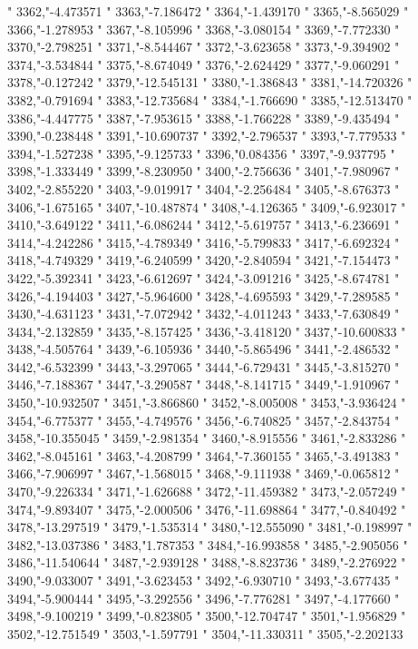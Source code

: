 "
3362,"-4.473571
"
3363,"-7.186472
"
3364,"-1.439170
"
3365,"-8.565029
"
3366,"-1.278953
"
3367,"-8.105996
"
3368,"-3.080154
"
3369,"-7.772330
"
3370,"-2.798251
"
3371,"-8.544467
"
3372,"-3.623658
"
3373,"-9.394902
"
3374,"-3.534844
"
3375,"-8.674049
"
3376,"-2.624429
"
3377,"-9.060291
"
3378,"-0.127242
"
3379,"-12.545131
"
3380,"-1.386843
"
3381,"-14.720326
"
3382,"-0.791694
"
3383,"-12.735684
"
3384,"-1.766690
"
3385,"-12.513470
"
3386,"-4.447775
"
3387,"-7.953615
"
3388,"-1.766228
"
3389,"-9.435494
"
3390,"-0.238448
"
3391,"-10.690737
"
3392,"-2.796537
"
3393,"-7.779533
"
3394,"-1.527238
"
3395,"-9.125733
"
3396,"0.084356
"
3397,"-9.937795
"
3398,"-1.333449
"
3399,"-8.230950
"
3400,"-2.756636
"
3401,"-7.980967
"
3402,"-2.855220
"
3403,"-9.019917
"
3404,"-2.256484
"
3405,"-8.676373
"
3406,"-1.675165
"
3407,"-10.487874
"
3408,"-4.126365
"
3409,"-6.923017
"
3410,"-3.649122
"
3411,"-6.086244
"
3412,"-5.619757
"
3413,"-6.236691
"
3414,"-4.242286
"
3415,"-4.789349
"
3416,"-5.799833
"
3417,"-6.692324
"
3418,"-4.749329
"
3419,"-6.240599
"
3420,"-2.840594
"
3421,"-7.154473
"
3422,"-5.392341
"
3423,"-6.612697
"
3424,"-3.091216
"
3425,"-8.674781
"
3426,"-4.194403
"
3427,"-5.964600
"
3428,"-4.695593
"
3429,"-7.289585
"
3430,"-4.631123
"
3431,"-7.072942
"
3432,"-4.011243
"
3433,"-7.630849
"
3434,"-2.132859
"
3435,"-8.157425
"
3436,"-3.418120
"
3437,"-10.600833
"
3438,"-4.505764
"
3439,"-6.105936
"
3440,"-5.865496
"
3441,"-2.486532
"
3442,"-6.532399
"
3443,"-3.297065
"
3444,"-6.729431
"
3445,"-3.815270
"
3446,"-7.188367
"
3447,"-3.290587
"
3448,"-8.141715
"
3449,"-1.910967
"
3450,"-10.932507
"
3451,"-3.866860
"
3452,"-8.005008
"
3453,"-3.936424
"
3454,"-6.775377
"
3455,"-4.749576
"
3456,"-6.740825
"
3457,"-2.843754
"
3458,"-10.355045
"
3459,"-2.981354
"
3460,"-8.915556
"
3461,"-2.833286
"
3462,"-8.045161
"
3463,"-4.208799
"
3464,"-7.360155
"
3465,"-3.491383
"
3466,"-7.906997
"
3467,"-1.568015
"
3468,"-9.111938
"
3469,"-0.065812
"
3470,"-9.226334
"
3471,"-1.626688
"
3472,"-11.459382
"
3473,"-2.057249
"
3474,"-9.893407
"
3475,"-2.000506
"
3476,"-11.698864
"
3477,"-0.840492
"
3478,"-13.297519
"
3479,"-1.535314
"
3480,"-12.555090
"
3481,"-0.198997
"
3482,"-13.037386
"
3483,"1.787353
"
3484,"-16.993858
"
3485,"-2.905056
"
3486,"-11.540644
"
3487,"-2.939128
"
3488,"-8.823736
"
3489,"-2.276922
"
3490,"-9.033007
"
3491,"-3.623453
"
3492,"-6.930710
"
3493,"-3.677435
"
3494,"-5.900444
"
3495,"-3.292556
"
3496,"-7.776281
"
3497,"-4.177660
"
3498,"-9.100219
"
3499,"-0.823805
"
3500,"-12.704747
"
3501,"-1.956829
"
3502,"-12.751549
"
3503,"-1.597791
"
3504,"-11.330311
"
3505,"-2.202133

